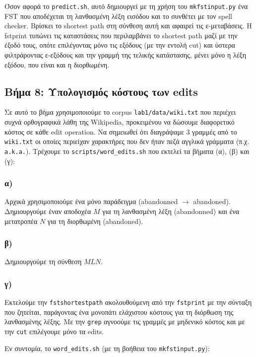 \documentclass[a4paper, 12pt]{article}
\begin{document}
        	Όσον αφορά το \verb|predict.sh|, αυτό δημιουργεί με τη χρήση του \verb|mkfstinput.py| ένα FST που αποδέχεται τη λανθασμένη λέξη εισόδου και το συνθέτει με τον spell checker. Βρίσκει το shortest path στη σύνθεση αυτή και αφαιρεί τις ε-μεταβάσεις. Η fstprint τυπώνει τις καταστάσεις που περιλαμβάνει το shortest path μαζί με την έξοδό τους, οπότε επιλέγοντας μόνο τις εξόδους (με την εντολή cut) και ύστερα φιλτράροντας ε-εξόδους και την γραμμή της τελικής κατάστασης, μένει μόνο η λέξη εξόδου, που είναι και η διορθωμένη.
        
    \subsection*{Βήμα 8: Υπολογισμός κόστους των edits}
        Σε αυτό το βήμα χρησιμοποιούμε το corpus \verb|lab1/data/wiki.txt| που περιέχει συχνά ορθογραφικά λάθη της Wikipedia, προκειμένου να δώσουμε διαφορετικό κόστος σε κάθε edit operation. Να σημειωθεί ότι διαγράψαμε 3 γραμμές από το \verb|wiki.txt| οι οποίες περιείχαν χαρακτήρες που δεν ήταν πεζά αγγλικά γράμματα (π.χ. \verb|a.k.a.|). Τρέχουμε το \verb|scripts/word_edits.sh| που εκτελεί τα βήματα (α), (β) και (γ):
        
        \subsubsection*{α)}   
        	Αρχικά χρησιμοποιούμε ένα μόνο παράδειγμα (abandonned $\rightarrow$ abandoned). Δημιουργούμε έναν αποδοχέα $M$ για τη λανθασμένη λέξη (abandonned) και ένα μετατροπέα $N$ για τη διορθωμένη (abandoned).
        	
        \subsubsection*{β)}   
        	Δημιουργούμε τη σύνθεση $MLN$.
        	
        \subsubsection*{γ)}   
        	Εκτελούμε την \verb|fstshortestpath| ακολουθούμενη από την \verb|fstprint| με την σύνταξη που ζητείται, παράγοντας ένα μονοπάτι ελάχιστου κόστους για τη διόρθωση της λανθασμένης λέξης. Με την \verb|grep| αγνοούμε τις γραμμές με μηδενικό κόστος και με την \verb|cut| επιλέγουμε μόνο τα edits. 
        	
        	Εν συντομία, το \verb|word_edits.sh| (με τη βοήθεια του \verb|mkfstinput.py|):
        	
\end{document}
